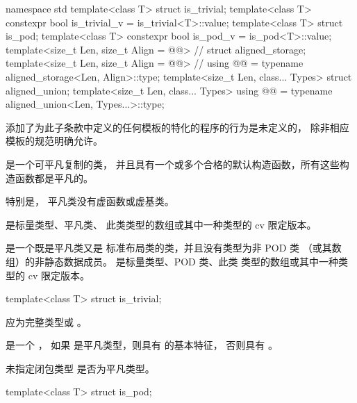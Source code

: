 \begin{codeblock}
namespace std {
  template<class T> struct is_trivial;
  template<class T> constexpr bool is_trivial_v = is_trivial<T>::value;
  template<class T> struct is_pod;
  template<class T> constexpr bool is_pod_v = is_pod<T>::value;
  template<size_t Len, size_t Align = @@> // \seebelow
    struct aligned_storage;
  template<size_t Len, size_t Align = @@> // \seebelow
    using @@ = typename aligned_storage<Len, Align>::type;
  template<size_t Len, class... Types>
    struct aligned_union;
  template<size_t Len, class... Types>
    using @@ = typename aligned_union<Len, Types...>::type;
}
\end{codeblock}

\pnum
添加了为此子条款中定义的任何模板的特化的程序的行为是未定义的，
除非相应模板的规范明确允许。

\pnum
\label{term.trivial.type}%
 是一个可平凡复制的类，
并且具有一个或多个合格的默认构造函数，所有这些构造函数都是平凡的。
\begin{note}
特别是，
平凡类没有虚函数或虚基类。
\end{note}
 是标量类型、平凡类、
此类类型的数组或其中一种类型的 cv 限定版本。

\pnum
{}%
 是一个既是平凡类又是
标准布局类的类，并且没有类型为非 POD 类
（或其数组）的非静态数据成员。 是标量类型、POD 类、此类
类型的数组或其中一种类型的 cv 限定版本。

%
\begin{itemdecl}
template<class T> struct is_trivial;
\end{itemdecl}

\begin{itemdescr}
\pnum
\expects
{} 应为完整类型或 \cv{} 。

\pnum
\remarks
{} 是一个 ，
如果  是平凡类型，则具有  的基本特征，
否则具有 。

\pnum
\begin{note}
未指定闭包类型 是否为平凡类型。
\end{note}
\end{itemdescr}

%
\begin{itemdecl}
template<class T> struct is_pod;
\end{itemdecl}


